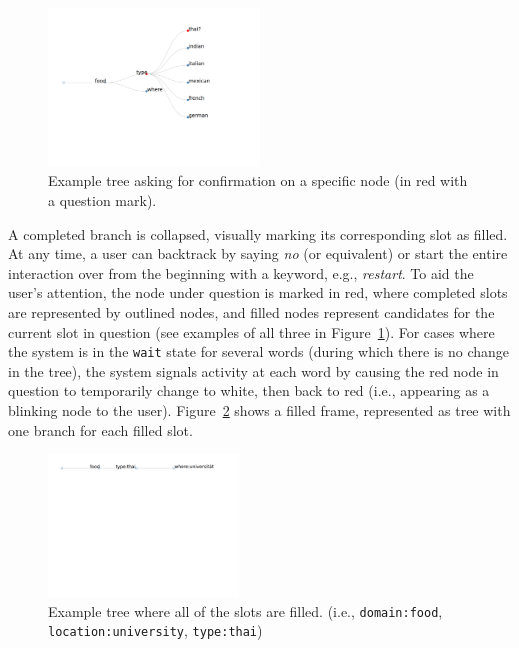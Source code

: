 \documentclass[11pt]{article}
\begin{document}
\begin{figure}[ht]
  \centering
      \includegraphics[width=0.5\textwidth]{figures/diatree-confirmation.pdf}	
      \caption{Example tree asking for confirmation on a specific node (in red with a question mark).\label{fig:confirm}}
\end{figure}

A completed branch is collapsed, visually marking its corresponding slot as filled. At any time, a user can backtrack by saying \emph{no} (or equivalent) or start the entire interaction over from the beginning with a keyword, e.g., \emph{restart}. To aid the user's attention, the node under question is marked in red, where completed slots are represented by outlined nodes, and filled nodes represent candidates for the current slot in question (see examples of all three in Figure~\ref{fig:confirm}). For cases where the system is in the \texttt{wait} state for several words (during which there is no change in the tree), the system signals activity at each word by causing the red node in question to temporarily change to white, then back to red (i.e., appearing as a blinking node to the user). Figure~\ref{fig:filled} shows a filled frame, represented as tree with one branch for each filled slot.

\begin{figure}[ht]
  \centering
      \includegraphics[width=0.45\textwidth]{figures/diatree-filled.pdf}	
      \caption{Example tree where all of the slots are filled. (i.e., \texttt{domain:food}, \texttt{location:university}, \texttt{type:thai}) \label{fig:filled}}
\end{figure}
\end{document}
